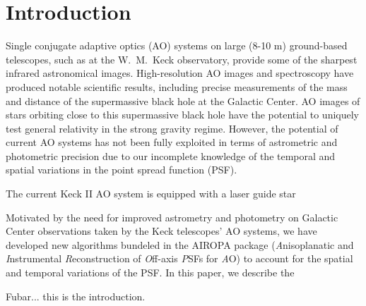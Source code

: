 \maketitle
\section{Introduction}

Single conjugate adaptive optics (AO) systems on large (8-10 m)
ground-based telescopes, such as at the W.~M.~Keck observatory,
provide some of the sharpest infrared astronomical images. 
High-resolution AO images and spectroscopy have produced 
notable scientific results, including precise measurements of the mass
and distance of the supermassive black hole at the Galactic Center. 
AO images of stars orbiting close to this supermassive black
hole have the potential to uniquely test general relativity in the strong
gravity regime. However, the potential of current AO systems has not been
fully exploited in terms of astrometric and photometric precision due
to our incomplete knowledge of the temporal and spatial variations in
the point spread function (PSF). 

The current Keck II AO system is equipped with a laser guide star 


Motivated by the need for improved
astrometry and photometry on Galactic Center observations taken by the
Keck telescopes' AO systems, we have developed new algorithms bundeled
in the AIROPA package ({\it A}nisoplanatic and {\it I}nstrumental {\it
  R}econstruction of {\it O}ff-axis {\it P}SFs for {\it A}O) to
account for the spatial and temporal variations of the PSF. 
In this paper, we describe the 


Fubar... this is the introduction. \cite{Britton:2006}


